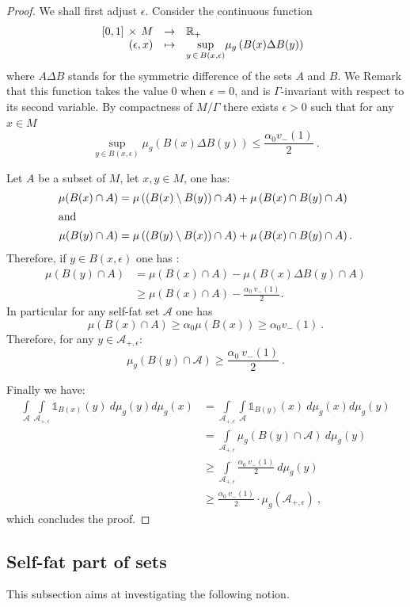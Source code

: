 \documentclass[AHL,Unicode,longabstracts,published]{cedram}
\newcommand{\dsun}{\mathds{1}}
\newcommand{\cA}{\mathcal{A}}
\newcommand{\RR}{\mathbb{R}}
\newcommand{\inte}[1]{\underset{#1}{\int}}
\newcommand{\supr}[1]{\underset{#1}{\sup}}
\newcommand{\fonctionbis}[4]{
\begin{array}{r c l}
#1 & \to & #2 \\
#3 & \mapsto & #4 \\
\end{array}}
\begin{document}
\begin{proof}
We shall first adjust $\epsilon$. Consider the continuous function
\[
\fonctionbis{[0,1]\,\times\,M}{\RR_+}{(\epsilon,x)}{\supr{y\,\in\,B(x,\epsilon)} \mu_g\left(B(x) \Delta B(y)\right)} \ \,
\]
where $ A\Delta B$ stands for the symmetric difference of the sets $A$ and $B$. We Remark that this function takes the value $0$ when $\epsilon=0$, and is $\Gamma$-invariant with respect to its second variable. By compactness of $M/\Gamma$ there exists $\epsilon>0$ such that for any $x \in M$
\[
\supr{y \in B(x,\epsilon)} \mu_g\left(B(x) \Delta B(y)\right) \le \frac{\alpha_0 v_-(1)}{2} \ .
\]

Let $A$ be a subset of $M$, let $x,y\in M$, one has:
\begin{align*}
\mu(B(x)\cap A) &= \mu\left(\left(B(x)\setminus B(y)\right) \cap A\right) + \mu \left(B(x)\cap B(y) \cap A\right)
\\
\intertext{and}
\mu(B(y)\cap A) &= \mu\left(\left(B(y)\setminus B(x)\right) \cap A\right) + \mu \left(B(x)\cap B(y) \cap A\right).
\end{align*}
Therefore, if $y\in B(x, \epsilon)$ one has :
\begin{align*}
\mu (B(y) \cap A) &= \mu(B(x) \cap A) -\mu \left(B(x) \Delta B(y) \cap A\right) \\
&\geq \mu\left(B(x) \cap A\right)- \frac{\alpha_0 \ v_-(1)}{2}.
\end{align*}
In particular for any self-fat set $\cA$ one has
\[
\mu(B(x) \cap A) \ge \alpha_0 \mu(B(x)) \ge \alpha_0 v_-(1) \ .
\]
Therefore, for any $y \in \cA_{+,\epsilon}$:
\[
\mu_g(B(y) \cap \cA) \ge \frac{\alpha_0 \ v_-(1)}{2} \ .
\]

Finally we have:
\begin{align*}
\inte{\cA} \inte{\cA_{+, \epsilon}} \dsun_{B(x)}(y) \ d \mu_g(y) d \mu_g(x) & = \inte{\cA_{+, \epsilon}}\inte{\cA} \dsun_{B(y)}(x) \ d \mu_g(x) d \mu_g(y) \\
& = \inte{\cA_{+, \epsilon}} \mu_g(B(y) \cap \cA) \ d \mu_g(y) \\
& \ge \inte{\cA_{+, \epsilon}} \frac{\alpha_0 \ v_-(1)}{2} \ d \mu_g(y) \\
& \ge \frac{\alpha_0 \ v_-(1)}{2} \cdot \mu_g\left(\cA_{+, \epsilon}\right) \ ,
\end{align*}
which concludes the proof.
\end{proof}


\subsection{Self-fat part of sets}
This subsection aims at investigating the following notion.
\end{document}
